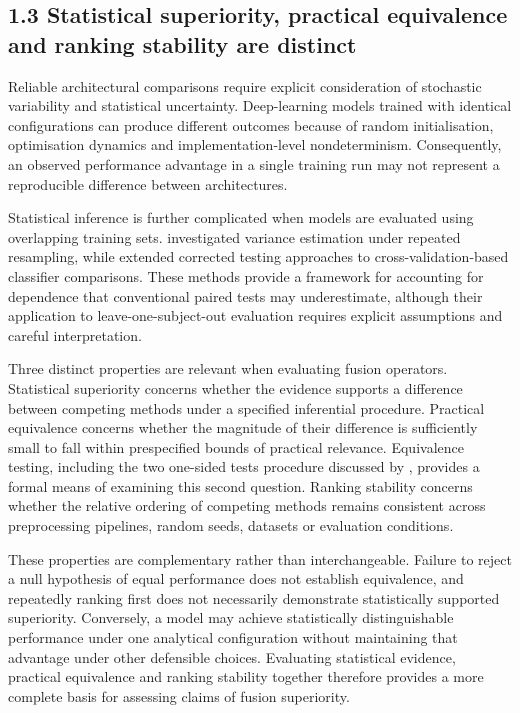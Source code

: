 \documentclass[11pt,a4paper]{article}
\begin{document}
\endgroup

\subsection{1.3 Statistical superiority, practical equivalence and ranking stability are distinct}\label{statistical-superiority-practical-equivalence-and-ranking-stability-are-distinct}

Reliable architectural comparisons require explicit consideration of stochastic
variability and statistical uncertainty. Deep-learning models trained with identical
configurations can produce different outcomes because of random initialisation,
optimisation dynamics and implementation-level nondeterminism. Consequently, an observed
performance advantage in a single training run may not represent a reproducible difference
between architectures.

Statistical inference is further complicated when models are evaluated using overlapping
training sets. \citet{Nadeau_2003} investigated variance estimation under repeated
resampling, while \citet{Bouckaert_2004} extended corrected testing approaches to
cross-validation-based classifier comparisons. These methods provide a framework for
accounting for dependence that conventional paired tests may underestimate, although their
application to leave-one-subject-out evaluation requires explicit assumptions and careful
interpretation.

Three distinct properties are relevant when evaluating fusion operators. Statistical
superiority concerns whether the evidence supports a difference between competing methods
under a specified inferential procedure. Practical equivalence concerns whether the
magnitude of their difference is sufficiently small to fall within prespecified bounds of
practical relevance. Equivalence testing, including the two one-sided tests procedure
discussed by \citet{Lakens_2017}, provides a formal means of examining this second question.
Ranking stability concerns whether the relative ordering of competing methods remains
consistent across preprocessing pipelines, random seeds, datasets or evaluation
conditions.

These properties are complementary rather than interchangeable. Failure to reject a null
hypothesis of equal performance does not establish equivalence, and repeatedly ranking
first does not necessarily demonstrate statistically supported superiority. Conversely, a
model may achieve statistically distinguishable performance under one analytical
configuration without maintaining that advantage under other defensible choices.
Evaluating statistical evidence, practical equivalence and ranking stability together
therefore provides a more complete basis for assessing claims of fusion superiority.
\end{document}
